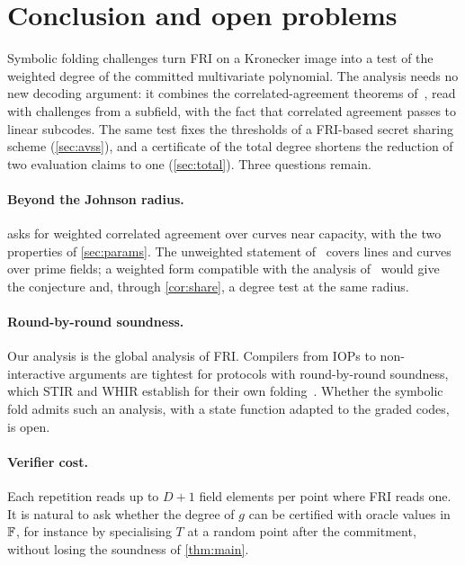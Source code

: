 \section{Conclusion and open problems}\label{sec:conclusion}

Symbolic folding challenges turn FRI on a Kronecker image into a test of the weighted
degree of the committed multivariate polynomial. The analysis needs no new decoding
argument: it combines the correlated-agreement theorems of~\cite{BCIKS20}, read with
challenges from a subfield, with the fact that correlated agreement passes to linear
subcodes. The same test fixes the thresholds of a FRI-based secret sharing scheme
(\cref{sec:avss}), and a certificate of the total degree shortens the reduction of two evaluation
claims to one (\cref{sec:total}). Three questions remain.

\paragraph{Beyond the Johnson radius.}  asks for weighted correlated
agreement over curves near capacity, with the two properties of \cref{sec:params}. The
unweighted statement of~\cite{Jer26} covers lines and curves over prime fields; a weighted
form compatible with the analysis of~\cite[\S8]{BCIKS20} would give the conjecture and,
through \cref{cor:share}, a degree test at the same radius.

\paragraph{Round-by-round soundness.} Our analysis is the global analysis of FRI. Compilers
from IOPs to non-interactive arguments are tightest for protocols with round-by-round
soundness, which STIR and WHIR establish for their own folding~\cite{ACFY24,ACFY25}. Whether
the symbolic fold admits such an analysis, with a state function adapted to the graded codes,
is open.

\paragraph{Verifier cost.} Each repetition reads up to $D+1$ field elements per point where
FRI reads one. It is natural to ask whether the degree of $g$ can be certified with
oracle values in $\mathbb{F}$, for instance by specialising $T$ at a random point after the
commitment, without losing the soundness of \cref{thm:main}.
